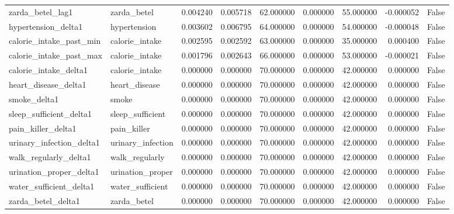 \begin{longtable}{llrrrrrrr}
zarda\_betel\_lag1 & zarda\_betel & 0.004240 & 0.005718 & 62.000000 & 0.000000 & 55.000000 & -0.000052 & False \\
hypertension\_delta1 & hypertension & 0.003602 & 0.006795 & 64.000000 & 0.000000 & 54.000000 & -0.000048 & False \\
calorie\_intake\_past\_min & calorie\_intake & 0.002595 & 0.002592 & 63.000000 & 0.000000 & 35.000000 & 0.000400 & False \\
calorie\_intake\_past\_max & calorie\_intake & 0.001796 & 0.002643 & 66.000000 & 0.000000 & 53.000000 & -0.000021 & False \\
calorie\_intake\_delta1 & calorie\_intake & 0.000000 & 0.000000 & 70.000000 & 0.000000 & 42.000000 & 0.000000 & False \\
heart\_disease\_delta1 & heart\_disease & 0.000000 & 0.000000 & 70.000000 & 0.000000 & 42.000000 & 0.000000 & False \\
smoke\_delta1 & smoke & 0.000000 & 0.000000 & 70.000000 & 0.000000 & 42.000000 & 0.000000 & False \\
sleep\_sufficient\_delta1 & sleep\_sufficient & 0.000000 & 0.000000 & 70.000000 & 0.000000 & 42.000000 & 0.000000 & False \\
pain\_killer\_delta1 & pain\_killer & 0.000000 & 0.000000 & 70.000000 & 0.000000 & 42.000000 & 0.000000 & False \\
urinary\_infection\_delta1 & urinary\_infection & 0.000000 & 0.000000 & 70.000000 & 0.000000 & 42.000000 & 0.000000 & False \\
walk\_regularly\_delta1 & walk\_regularly & 0.000000 & 0.000000 & 70.000000 & 0.000000 & 42.000000 & 0.000000 & False \\
urination\_proper\_delta1 & urination\_proper & 0.000000 & 0.000000 & 70.000000 & 0.000000 & 42.000000 & 0.000000 & False \\
water\_sufficient\_delta1 & water\_sufficient & 0.000000 & 0.000000 & 70.000000 & 0.000000 & 42.000000 & 0.000000 & False \\
zarda\_betel\_delta1 & zarda\_betel & 0.000000 & 0.000000 & 70.000000 & 0.000000 & 42.000000 & 0.000000 & False \\
\end{longtable}
